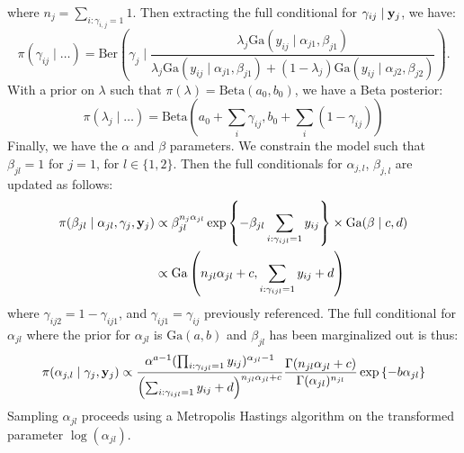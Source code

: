 where $n_j = \sum_{i:\gamma_{i,j} = 1} 1$.  Then extracting the full conditional
  for $\gamma_{ij}\mid {\bf y}_j$, we have:
\begin{equation*}
\pi(\gamma_{ij}\mid \ldots) = \text{Ber}\left(\gamma_j\mid \frac{\lambda_j\text{Ga}(y_{ij}\mid\alpha_{j1}, \beta_{j1})}{\lambda_j\text{Ga}(y_{ij}\mid\alpha_{j1}, \beta_{j1}) + (1 - \lambda_j)\text{Ga}(y_{ij}\mid\alpha_{j2}, \beta_{j2})}\right).
\end{equation*}
With a prior on $\lambda$ such that $\pi(\lambda) = \text{Beta}(a_0,b_0)$, we
  have a Beta posterior:
\begin{equation*}
\pi(\lambda_j\mid\ldots) = \text{Beta}\left(a_0 + \sum_i\gamma_{ij}, b_0 + \sum_i(1 - \gamma_{ij})\right)
\end{equation*}
Finally, we have the $\alpha$ and $\beta$ parameters.  We constrain the model
  such that $\beta_{jl} = 1$ for $j = 1$, for $l \in \lbrace 1, 2\rbrace$.  Then
  the full conditionals for $\alpha_{j,l}$, $\beta_{j,l}$ are updated as follows:
\begin{equation*}
  \begin{aligned}
    \pi(\beta_{jl}\mid\alpha_{jl},{\bf \gamma}_j,{\bf y}_j) &\propto \beta_{jl}^{n_j\alpha_{jl}}\exp\left\lbrace-\beta_{jl}\sum_{i:\gamma_{ijl} = 1}y_{ij}\right\rbrace\times\text{Ga}(\beta\mid c,d)\\
    &\propto \text{Ga}\left(n_{jl}\alpha_{jl} + c, \sum_{i:\gamma_{ijl} = 1}y_{ij} + d\right)
  \end{aligned}
\end{equation*}
where $\gamma_{ij2} = 1 - \gamma_{ij1}$, and $\gamma_{ij1} = \gamma_{ij}$
  previously referenced.  The full conditional for $\alpha_{jl}$ where the
  prior for $\alpha_{jl}$ is $\text{Ga}(a,b)$ and $\beta_{jl}$  has been
  marginalized out is thus:
\begin{equation*}
  \pi(\alpha_{j,l}\mid{\bf \gamma}_j,{\bf y}_j) \propto \frac{\alpha^{a - 1}(\prod_{i:\gamma_{ijl} = 1}y_{ij})^{\alpha_{jl} - 1}}{\left(\sum_{i:\gamma_{ijl} = 1}y_{ij} + d\right)^{n_{jl}\alpha_{jl} + c}}\frac{\Gamma(n_{jl}\alpha_{jl} + c)}{\Gamma(\alpha_{jl})^{n_{jl}}}\exp\left\lbrace-b\alpha_{jl}\right\rbrace
\end{equation*}
Sampling $\alpha_{jl}$ proceeds using a Metropolis Hastings algorithm on the
  transformed parameter $\log(\alpha_{jl})$.

